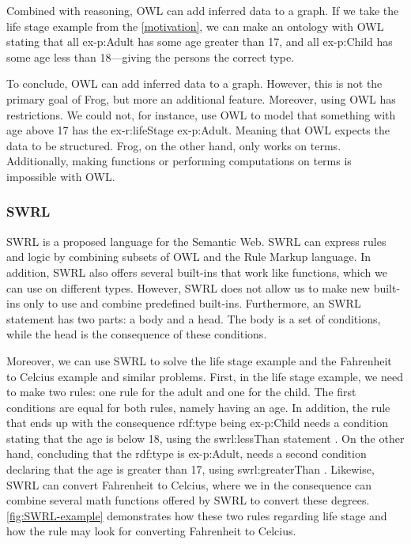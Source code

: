 \para
Combined with reasoning, OWL can add inferred data to a graph. If we take the life stage example from the \autoref{motivation}, we can make an ontology with OWL stating that all ex-p:Adult has some age greater than 17, and all ex-p:Child has some age less than 18—giving the persons the correct type.

\para 
To conclude, OWL can add inferred data to a graph. However, this is not the primary goal of Frog, but more an additional feature. Moreover, using OWL has restrictions. We could not, for instance, use OWL to model that something with age above 17 has the ex-r:lifeStage ex-p:Adult. Meaning that OWL expects the data to be structured. Frog, on the other hand, only works on terms. Additionally, making functions or performing computations on terms is impossible with OWL.

\subsubsection{SWRL}
SWRL \autocite{SWRL} is a proposed language for the Semantic Web. SWRL can express rules and logic by combining subsets of OWL and the Rule Markup language. In addition, SWRL also offers several built-ins that work like functions, which we can use on different types. However, SWRL does not allow us to make new built-ins only to use and combine predefined built-ins. Furthermore, an SWRL statement has two parts: a body and a head. The body is a set of conditions, while the head is the consequence of these conditions.

\para
Moreover, we can use SWRL to solve the life stage example and the Fahrenheit to Celcius example and similar problems. First, in the life stage example, we need to make two rules: one rule for the adult and one for the child. The first conditions are equal for both rules, namely having an age. In addition, the rule that ends up with the consequence rdf:type being ex-p:Child needs a condition stating that the age is below 18, using the swrl:lessThan statement \autocite{SWRL}. On the other hand, concluding that the rdf:type is ex-p:Adult, needs a second condition declaring that the age is greater than 17, using swrl:greaterThan \autocite{SWRL}. Likewise, SWRL can convert Fahrenheit to Celcius, where we in the consequence can combine several math functions offered by SWRL to convert these degrees. \autoref{fig:SWRL-example} demonstrates how these two rules regarding life stage and how the rule may look for converting Fahrenheit to Celcius. 

